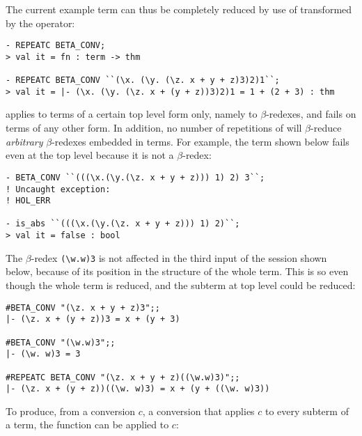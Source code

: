 The current example term can thus be completely reduced by use of
 transformed by the  operator:

\setcounter{sessioncount}{1}
\begin{session}
\begin{verbatim}
- REPEATC BETA_CONV;
> val it = fn : term -> thm

- REPEATC BETA_CONV ``(\x. (\y. (\z. x + y + z)3)2)1``;
> val it = |- (\x. (\y. (\z. x + (y + z))3)2)1 = 1 + (2 + 3) : thm
\end{verbatim}
\end{session}

 applies to terms of a certain top level form only,
namely to $\beta$-redexes, and fails on terms of any other form.  In
addition, no number of repetitions of  will
$\beta$-reduce {\it arbitrary\/} $\beta$-redexes embedded in terms.
For example, the term shown below fails even at the top level because
it is not a $\beta$-redex:

\setcounter{sessioncount}{1}
\begin{session}
\begin{verbatim}
- BETA_CONV ``(((\x.(\y.(\z. x + y + z))) 1) 2) 3``;
! Uncaught exception:
! HOL_ERR

- is_abs ``(((\x.(\y.(\z. x + y + z))) 1) 2)``;
> val it = false : bool
\end{verbatim}
\end{session}

\noindent
The $\beta$-redex {\small\verb|(\w.w)3|} is not affected in the third
input of the session shown below, because of its position in the
structure of the whole term.  This is so even though the whole term is
reduced, and the subterm at top level could be reduced:

\setcounter{sessioncount}{1}
\begin{session}\begin{verbatim}
#BETA_CONV "(\z. x + y + z)3";;
|- (\z. x + (y + z))3 = x + (y + 3)

#BETA_CONV "(\w.w)3";;
|- (\w. w)3 = 3

#REPEATC BETA_CONV "(\z. x + y + z)((\w.w)3)";;
|- (\z. x + (y + z))((\w. w)3) = x + (y + ((\w. w)3))
\end{verbatim}\end{session}

To produce, from a conversion $c$, a conversion that applies $c$ to every
subterm of a term, the function  can be applied to $c$:

